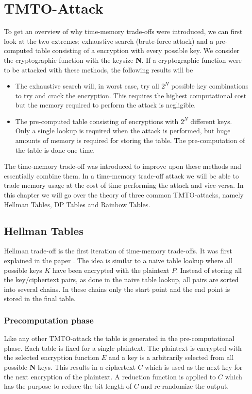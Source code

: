 \chapter{TMTO-Attack}
\label{ch:tmto}


To get an overview of why time-memory trade-offs were introduced, we
can first look at the two extremes; exhaustive search (brute-force
attack) and a pre-computed table consisting of a encryption with every
possible key. We consider the cryptographic function with the keysize
\textbf{N}. If a cryptographic function were to be attacked with these
methods, the following results will be
\begin{itemize}
\item The exhaustive search will, in worst case, try all $2^{N}$
  possible key combinations to try and crack the encryption. This
  requires the highest computational cost but the memory required to
  perform the attack is negligible.
\item The pre-computed table consisting of encryptions with $2^{N}$
  different keys. Only a single lookup is required when the attack is
  performed, but huge amounts of memory is required for storing the
  table. The pre-computation of the table is done one time.
\end{itemize}
The time-memory trade-off was introduced to improve upon these
methods and essentially combine them. In a time-memory trade-off
attack we will be able to trade memory usage at the cost of time
performing the attack and vice-versa. In this chapter we will go over
the theory of three common TMTO-attacks, namely Hellman Tables, DP
Tables and Rainbow Tables.

\section{Hellman Tables}
\label{sec:hmtheory}
Hellman trade-off is the first iteration of time-memory trade-offs. It
was first explained in the paper \cite{hells}.
The idea is similar to a naive table lookup where all possible keys $K$ have been encrypted with the plaintext $P$.
Instead of storing all the key/ciphertext pairs, as done in the naive
table lookup, all pairs are sorted into several chains. In these
chains only the start point and the end point is stored in the final table.

\subsection{Precomputation phase} %
Like any other TMTO-attack the table is generated in the
pre-computational phase. Each table is fixed for a single
plaintext. The plaintext is encrypted with the selected encryption
function $E$ and a key is a arbitrarily selected from all possible \textbf{N}
keys. This results in a ciphertext $C$ which is used as the
next key for the next encryption of the plaintext. A reduction
function is applied to $C$ which has the purpose to reduce the bit
length of $C$ and re-randomize the output.


